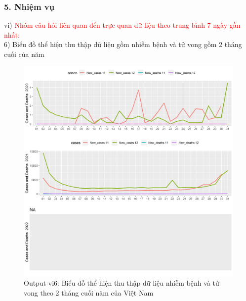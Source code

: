 \documentclass[english,10pt,table]{beamer}
\begin{document}
\begin{frame}[fragile]
\frametitle{5.  Nhiệm vụ}
vi) \textcolor{red}{Nhóm câu hỏi liên quan đến trực quan dữ liệu theo trung bình 7 ngày gần nhất:}\\
    6) Biểu đồ thể hiện thu thập dữ liệu gồm nhiễm bệnh và tử vong gồm 2 tháng cuối của năm
	\begin{figure}[h!]
	\begin{center}
		    \includegraphics[scale = 0.26]{Images/VI/vi6 Vietnam .jpeg}
		     \caption{Output vi6: Biểu đồ thể hiện thu thập dữ liệu nhiễm bệnh và tử vong theo 2 tháng cuối năm của Việt Nam}
		\end{center}
		\end{figure}
\end{frame}
\end{document}
